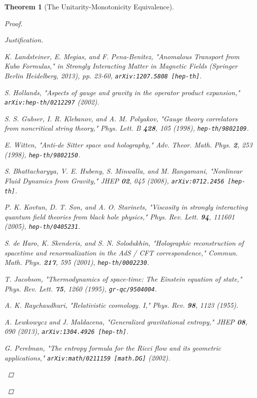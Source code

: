 \documentclass[11pt, letterpaper]{report}
\theoremstyle{plain} %
\newtheorem{theorem}{Theorem}[chapter]
\theoremstyle{definition} %
\theoremstyle{remark} %
\begin{document}
\begin{theorem}[The Unitarity-Monotonicity Equivalence]
\begin{proof}
\begin{proof}[Justification]
\begin{thebibliography}{99}
K. Landsteiner, E. Megias, and F. Pena-Benitez, "Anomalous Transport from Kubo Formulas," in \textit{Strongly Interacting Matter in Magnetic Fields} (Springer Berlin Heidelberg, 2013), pp. 23-60, \texttt{arXiv:1207.5808 [hep-th]}.

S. Hollands, "Aspects of gauge and gravity in the operator product expansion," \texttt{arXiv:hep-th/0212297} (2002).

S. S. Gubser, I. R. Klebanov, and A. M. Polyakov, "Gauge theory correlators from noncritical string theory," \textit{Phys. Lett. B} \textbf{428}, 105 (1998), \texttt{hep-th/9802109}.

E. Witten, "Anti-de Sitter space and holography," \textit{Adv. Theor. Math. Phys.} \textbf{2}, 253 (1998), \texttt{hep-th/9802150}.

S. Bhattacharyya, V. E. Hubeny, S. Minwalla, and M. Rangamani, "Nonlinear Fluid Dynamics from Gravity," \textit{JHEP} \textbf{02}, 045 (2008), \texttt{arXiv:0712.2456 [hep-th]}.

P. K. Kovtun, D. T. Son, and A. O. Starinets, "Viscosity in strongly interacting quantum field theories from black hole physics," \textit{Phys. Rev. Lett.} \textbf{94}, 111601 (2005), \texttt{hep-th/0405231}.

S. de Haro, K. Skenderis, and S. N. Solodukhin, "Holographic reconstruction of spacetime and renormalization in the AdS / CFT correspondence," \textit{Commun. Math. Phys.} \textbf{217}, 595 (2001), \texttt{hep-th/0002230}.

T. Jacobson, "Thermodynamics of space-time: The Einstein equation of state," \textit{Phys. Rev. Lett.} \textbf{75}, 1260 (1995), \texttt{gr-qc/9504004}.

A. K. Raychaudhuri, "Relativistic cosmology. I," \textit{Phys. Rev.} \textbf{98}, 1123 (1955).

A. Lewkowycz and J. Maldacena, "Generalized gravitational entropy," \textit{JHEP} \textbf{08}, 090 (2013), \texttt{arXiv:1304.4926 [hep-th]}.

G. Perelman, "The entropy formula for the Ricci flow and its geometric applications," \texttt{arXiv:math/0211159 [math.DG]} (2002).


\end{thebibliography}
\end{proof}
\end{proof}
\end{theorem}
\end{document}
